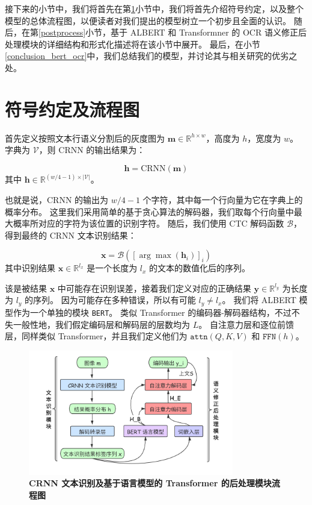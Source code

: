 接下来的小节中，我们将首先在第\ref{notation}小节中，我们将首先介绍符号约定，以及整个模型的总体流程图，以便读者对我们提出的模型树立一个初步且全面的认识。
随后，在第\ref{postprocess}小节，基于 ALBERT 和 Transformner 的 OCR 语义修正后处理模块的详细结构和形式化描述将在该小节中展开。
最后，在小节\ref{conclusion_bert_ocr}中，我们总结我们的模型，并讨论其与相关研究的优劣之处。

\section{符号约定及流程图}
\label{notation}
首先定义按照文本行语义分割后的灰度图为 $\bm{m} \in \mathbb{R}^{h \times w}$，高度为 $h$，宽度为 $w$。
字典为 $\mathcal{V}$，则 CRNN 的输出结果为：

\begin{equation}
	\bm{h} = \text{CRNN}(\bm{m})
\end{equation}
其中 $\bm{h} \in \mathbb{R}^{(w / 4 - 1) \times |\mathcal{V}|}$。

也就是说，CRNN 的输出为 $w / 4 - 1$ 个字符，其中每一个行向量为它在字典上的概率分布。
这里我们采用简单的基于贪心算法的解码器，我们取每个行向量中最大概率所对应的字符为该位置的识别字符。
随后，我们使用 CTC 解码函数 $\mathcal{B}$，得到最终的 CRNN 文本识别结果：

\begin{equation}
	\bm{x} = \mathcal{B}([\arg \max(\bm{h}_i)]_i)
\end{equation}
其中识别结果 $\bm{x} \in \mathbb{R}^{l_x}$ 是一个长度为 $l_x$ 的文本的数值化后的序列。

该是被结果 $\bm{x}$ 中可能存在识别误差，接着我们定义对应的正确结果 $\bm{y} \in \mathbb{R}^{l_y}$ 为长度为 $l_y$ 的序列。
因为可能存在多种错误，所以有可能 $l_y \ne l_x$。
我们将 ALBERT 模型作为一个单独的模块 \texttt{BERT}。
类似 Transformer 的编码器-解码器结构，不过不失一般性地，我们假定编码层和解码层的层数均为 $L$。
自注意力层和逐位前馈层，同样类似 Transformer，并且我们定义他们为 $\texttt{attn}(Q, K, V)$ 和 $\texttt{FFN}(h)$。

\begin{figure}[h!]
	\centering
	\includegraphics[width=0.8\textwidth]{figure/resources/overall.png}
	\caption{\textbf{CRNN 文本识别及基于语言模型的 Transformer 的后处理模块流程图}\label{overall_arch}}
\end{figure}

